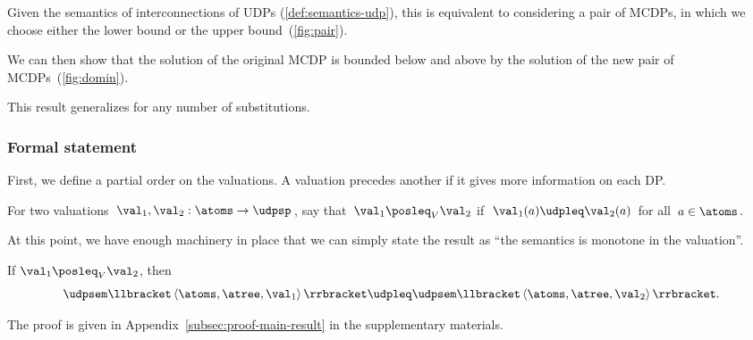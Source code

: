 \noindent Given the semantics of interconnections of UDPs (\cref{def:semantics-udp}),
this is equivalent to considering a pair of MCDPs, in which we choose
either the lower bound or the upper bound~(\cref{fig:pair}).
\begin{center}
\end{center}

\noindent We can then show that the solution of the original MCDP
is bounded below and above by the solution of the new pair of MCDPs~(\cref{fig:domin}).
\begin{center}
\end{center}

This result generalizes for any number of substitutions.

\subsubsection*{Formal statement}

First, we define a partial order on the valuations. A valuation precedes
another if it gives more information on each DP.
\begin{definition}
    \label{def:For-two-valuations,}For two valuations~$\val_{1},\val_{2}:\atoms\rightarrow\udpsp$,
    say that~$\val_{1}\posleq_{V}\val_{2}$ if~$\val_{1}(a)\udpleq\val_{2}(a)$
    for all~$a\in\atoms$.
\end{definition}
At this point, we have enough machinery in place that we can simply
state the result as ``the semantics is monotone in the valuation''.
\begin{theorem}
    \label{thm:udpsem-monotone}If $\val_{1}\posleq_{V}\val_{2}$, then
    \[
        \udpsem\llbracket\left\langle \atoms,\atree,\val_{1}\right\rangle \rrbracket\udpleq\udpsem\llbracket\left\langle \atoms,\atree,\val_{2}\right\rangle \rrbracket.
    \]
\end{theorem}
The proof is given in Appendix~\cref{subsec:proof-main-result}
in the supplementary materials.

